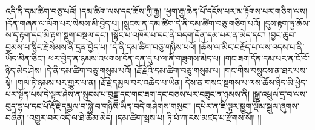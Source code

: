 འདི་ནི་དམ་ཚིག་བཅུ་པའོ། །དམ་ཚིག་ལས་དང་ཆོས་ཀྱི་རྒྱ། །ཕྱག་རྒྱ་ཆེན་པོ་དངོས་པར་མ་རྟོགས་པར་གཅིག་ལས། །དོན་གཞན་ལ་ལོག་པར་སེམས་མི་བྱེད་པ། །སྲུངས་ན་དམ་ཚིག་དེ་ནི་དམ་ཚིག་བཅུ་གཅིག་པའོ། །དུས་རྟག་ཏུ་ཆོས་ས་དྭ་རྟག་དང་མི་རྟག་སྡུག་བསྔལ་དང་། །སྟོང་པ་འཁོར་པ་དང་ནི་བདག་དོན་དམ་པར་ན་མེད་དང་། །བྱང་ཆུབ་བྱམས་པ་སྙིང་རྗེ་སེམས་ནི་དྲན་བྱེད་པ། །དེ་ནི་དམ་ཚིག་བཅུ་གཉིས་པའོ། །ཆོས་ལ་མིང་བརྗོད་པ་ལས་འདས་པ་ནི་ཡོད་མིན་ཅིང་།  ཕར་བྱེད་ན་ཉམས་འཕགས་དོན་དན་དུ་པ་ལ་ནི་གཟུགས་མེད་པ། །གང་ཟག་དོན་དམ་པར་ན་ངོ་བོ་ཉིད་མེད་ཤེས། །དེ་ནི་དམ་ཚིག་བཅུ་གསུམ་པའོ། །རྡོ་རྗེའི་དམ་ཚིག་བཅུ་གསུམ་པ། །གང་གིས་བསྲུངས་ན་ཐར་པས་སྟེ། །གལ་ཏེ་ཉམས་པར་གྱུར་པ་ན། །རྡོ་རྗེ་དམྱལ་བར་འཆེད་པ་ཡིན། དེས་ན་གསང་སྔགས་པ་ལས་ཆོས་ཉིད་མི་ཕྱེད་པར་སྟོན་པས་དེ་ལྟར་ཤེས་ན་སྲུངས་པ་བུངྡྡྷ་དང་གང་ཟག་དང་བཅས་པར་བཟུང་ན་ཉམས་ནི། །སྒྱུ་འཕྲུལ་དྲ་བ་ལས་བུད་དྷ་པ་དང་པོ་རྡོ་རྗེ་དམྱལ་བ་སྐྱེ་བ་གཉིས་ཡིན་བདེ་གཤེགས་གསུང་། །དཔེར་ན་ཇི་ལྟར་སྨྱུག་ལྡོམ་སྦྲུལ་ཞུགས་བཞིན། །འགྱུར་བར་འདི་ལ་ཐེ་ཚོམ་མེད། །དམ་ཚིག་སྦས་པ། ཏི་པཾ་ཀ་རས་མཛད་པ་རྫོགས་སོ།། །།
